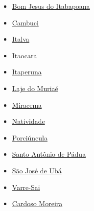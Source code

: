 \documentclass[10pt]{article} %
\begin{document}
\begin{minipage}[t]{.30\linewidth}
\begin{mdframed}[style=sidebar,frametitle={}]
\begin{itemize}
\item \hyperlink{https:/alerta.dengue.mat.br/alerta/3300605}{Bom Jesus do Itabapoana}
\item \hyperlink{https:/alerta.dengue.mat.br/alerta/3300902}{Cambuci}
\item \hyperlink{https:/alerta.dengue.mat.br/alerta/3302056}{Italva}
\item \hyperlink{https:/alerta.dengue.mat.br/alerta/3302106}{Itaocara}
\item \hyperlink{https:/alerta.dengue.mat.br/alerta/3302205}{Itaperuna}
\item \hyperlink{https:/alerta.dengue.mat.br/alerta/3302304}{Laje do Muriaé}
\item \hyperlink{https:/alerta.dengue.mat.br/alerta/3303005}{Miracema}
\item \hyperlink{https:/alerta.dengue.mat.br/alerta/3303104}{Natividade}
\item \hyperlink{https:/alerta.dengue.mat.br/alerta/3304102}{Porciúncula}
\item \hyperlink{https:/alerta.dengue.mat.br/alerta/3304706}{Santo Antônio de Pádua}
\item \hyperlink{https:/alerta.dengue.mat.br/alerta/3305133}{São José de Ubá}
\item \hyperlink{https:/alerta.dengue.mat.br/alerta/3306156}{Varre-Sai}
\item \hyperlink{https:/alerta.dengue.mat.br/alerta/3301157}{Cardoso Moreira}
\end{itemize}\end{mdframed}\hfill\end{minipage}\newpage
\end{document}
